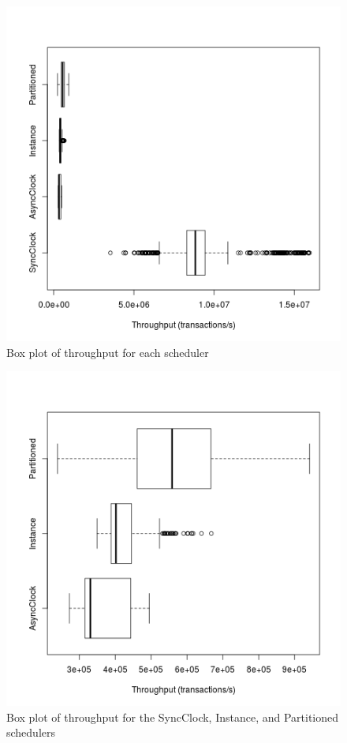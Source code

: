 \begin{figure}
\center
\includegraphics[width=\textwidth]{throughput_box.png}
\caption{Box plot of throughput for each scheduler \label{throughput_box}}
\end{figure}

\begin{figure}
\center
\includegraphics[width=\textwidth]{throughput_box_no_sync.png}
\caption{Box plot of throughput for the SyncClock, Instance, and Partitioned schedulers \label{throughput_box_no_sync}}
\end{figure}

